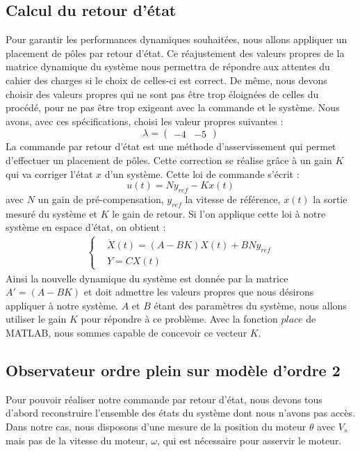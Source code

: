 \subsection{Calcul du retour d'état}
\label{sub:Calcul du retour etat}
Pour garantir les performances dynamiques souhaitées, nous allons appliquer un placement de pôles par retour d'état. Ce réajustement des valeurs propres de la matrice dynamique du système nous permettra de répondre aux attentes du cahier des charges si le choix de celles-ci est correct. De même, nous devons choisir des valeurs propres qui ne sont pas être trop éloignées de celles du procédé, pour ne pas être trop exigeant avec la commande et le système. Nous avons, avec ces spécifications, choisi les valeur propres suivantes :
\begin{equation}
\label{equation:valeurPropres}
\lambda = \begin{pmatrix}
-4 &-5
\end{pmatrix}
\end{equation}
La commande par retour d'état est une méthode d'asservissement qui permet d'effectuer un placement de pôles. Cette correction se réalise grâce à un gain $K$ qui va corriger l'état $x$ d'un système. Cette loi de commande s'écrit : 
\begin{equation}
u(t) = Ny_{ref}-Kx(t)
\end{equation} avec $N$ un gain de pré-compensation, $y_{ref}$ la vitesse de référence, $x(t)$ la sortie mesuré du système et $K$ le gain de retour. Si l'on applique cette loi à notre système en espace d'état, on obtient : 
\begin{align*}
\left\lbrace
\begin{aligned}
&\dot{X}(t) = (A-BK)X(t) + BNy_{ref}\\
&Y = CX(t)
\end{aligned}
\right.
\end{align*}
Ainsi la nouvelle dynamique du système est donnée par la matrice $A' = (A-BK)$ et doit admettre les valeurs propres que nous désirons appliquer à notre système. $A$ et $B$ étant des paramètres du système, nous allons utiliser le gain $K$ pour répondre à ce problème. Avec la fonction $place$ de MATLAB, nous sommes capable de concevoir ce vecteur $K$. 


\subsection{Observateur ordre plein sur modèle d'ordre 2\label{sub:constructionObeservateur}}
Pour pouvoir réaliser notre commande par retour d'état, nous devons tous d'abord reconstruire l'ensemble des états du système dont nous n'avons pas accès. Dans notre cas, nous disposons d'une mesure de la position du moteur $\theta$ avec $V_s$ mais pas de la vitesse du moteur, $\omega$, qui est nécessaire pour asservir le moteur.


